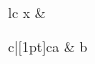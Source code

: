 \documentclass{article}
\begin{document}
\begin{tabu}{lc}
x & \begin{tabular}{c|[1pt]c}a & b\end{tabular} \\
\end{tabu}
\end{document}
